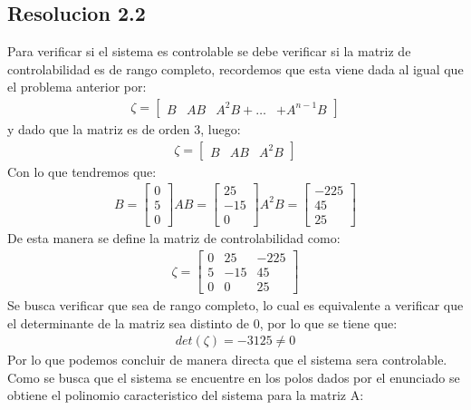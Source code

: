 \documentclass[
  11pt,
  letterpaper,
   addpoints,
   answers
  ]{exam}
\begin{document}
\begin{questions}
\begin{solution}
\subsection*{Resolucion 2.2}
Para verificar si el sistema es controlable se debe verificar si la matriz de controlabilidad es de rango completo, recordemos que esta viene dada al igual que el problema anterior por:
\begin{align}
    \zeta =
    \begin{bmatrix}
         B & AB & A^{2}B + \dots & + A^{n-1}B
    \end{bmatrix}
\end{align}
y dado que la matriz es de orden 3, luego:
\begin{align}
    \zeta =
    \begin{bmatrix}
        B & AB & A^{2}B
    \end{bmatrix}
\end{align}
Con lo que tendremos que:
\begin{align}
    B = 
    \begin{bmatrix}
        0\\
        5\\
        0
    \end{bmatrix}
    AB = 
    \begin{bmatrix}
        25\\
        -15\\
        0
    \end{bmatrix}
    A^{2}B = 
    \begin{bmatrix}
        -225\\
        45\\
        25
    \end{bmatrix}
\end{align}
De esta manera se define la matriz de controlabilidad como:
\begin{align}
    \zeta =
    \begin{bmatrix}
        0 & 25 & -225\\
        5 & -15 & 45\\
        0 & 0 & 25
    \end{bmatrix}
\end{align}
Se busca verificar que sea de rango completo, lo cual es equivalente a verificar que el determinante de la matriz sea distinto de 0, por lo que se tiene que:
\begin{align}
    det(\zeta) = -3125 \neq 0
\end{align}
Por lo que podemos concluir de manera directa que el sistema sera controlable. Como se busca que el sistema se encuentre en los polos dados por el enunciado se obtiene el polinomio caracteristico del sistema para la matriz A:

\end{solution}
\end{questions}
\end{document}

